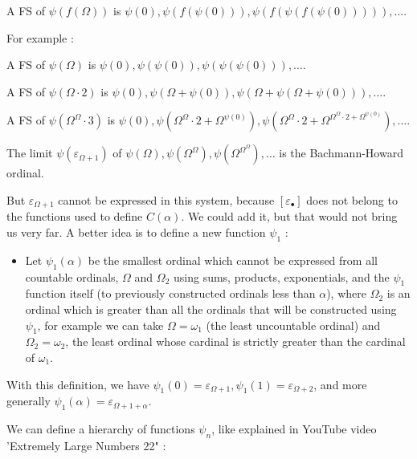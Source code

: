 \documentclass[10pt]{article}
\begin{document}
A FS of \( \psi(f(\Omega)) \) is \( \psi(0), \psi(f(\psi(0))), \psi(f(\psi(f(\psi(0))))), \ldots \).

For example :

A FS of \( \psi(\Omega) \) is \( \psi(0), \psi(\psi(0)), \psi(\psi(\psi(0))), \ldots \).

A FS of \( \psi(\Omega \cdot 2) \) is \( \psi(0), \psi(\Omega+\psi(0)), \psi(\Omega+\psi(\Omega+\psi(0))), \ldots \).

A FS of \( \psi(\Omega^\Omega \cdot 3) \) is \( \psi(0), \psi(\Omega^\Omega \cdot 2+\Omega^{\psi(0)}), \psi(\Omega^\Omega \cdot 2+\Omega^{\Omega^\Omega \cdot 2+\Omega^{\psi(0)}}), \ldots \).

\bigskip

The limit \( \psi(\varepsilon_{\Omega+1}) \) of \( \psi(\Omega), \psi(\Omega^\Omega), \psi(\Omega^{\Omega^\Omega}), \ldots \) is the Bachmann-Howard ordinal. 

But \( \varepsilon_{\Omega+1} \) cannot be expressed in this system, because \( [ \varepsilon_\bullet ] \) does not belong to the functions used to define \( C(\alpha) \). We could add it, but that would not bring us very far. A better idea is to define a new function \( \psi_1 \) :

\begin{itemize}\item[\hspace{12pt}]

Let \( \psi_1(\alpha) \) be the smallest ordinal which cannot be expressed from all countable ordinals, \( \Omega \) and \( \Omega _{2} \) using sums, products, exponentials, and the \( \psi _{1} \) function itself (to previously constructed ordinals less than \( \alpha \)), where \( \Omega_2 \) is an ordinal which is greater than all the ordinals that will be constructed using \( \psi_1 \), for example we can take \( \Omega = \omega_1 \) (the least uncountable ordinal) and \( \Omega_2 = \omega_2 \), the least ordinal whose cardinal is strictly greater than the cardinal of \( \omega_1 \).

\end{itemize}

With this definition, we have \( \psi_1(0) = \varepsilon_{\Omega+1}, \psi_1(1) = \varepsilon_{\Omega+2} \), and more generally \( \psi_1(\alpha) = \varepsilon_{\Omega+1+\alpha} \).

\bigskip

We can define a hierarchy of functions \( \psi_n \), like explained in YouTube video 'Extremely Large Numbers 22" :
\end{document}
